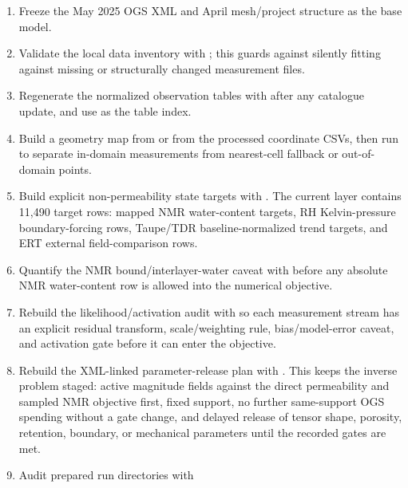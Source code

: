 \begin{enumerate}[leftmargin=1.5em]
  \item Freeze the May 2025 OGS XML and April mesh/project structure as the base model.
  \item Validate the local data inventory with
  ; this guards
  against silently fitting against missing or structurally changed measurement files.
  \item Regenerate the normalized observation tables with
   after any
  catalogue update, and use  as the table
  index.
  \item Build a geometry map from  or
  from the processed coordinate CSVs, then run
   to separate
  in-domain measurements from nearest-cell fallback or out-of-domain points.
  \item Build explicit non-permeability state targets with
  .  The current
  layer contains 11,490 target rows: mapped NMR water-content targets, RH
  Kelvin-pressure boundary-forcing rows, Taupe/TDR baseline-normalized trend targets,
  and ERT external field-comparison rows.
  \item Quantify the NMR bound/interlayer-water caveat with
   before any
  absolute NMR water-content row is allowed into the numerical objective.
  \item Rebuild the likelihood/activation audit with
   so each
  measurement stream has an explicit residual transform, scale/weighting rule,
  bias/model-error caveat, and activation gate before it can enter the objective.
  \item Rebuild the XML-linked parameter-release plan with
  .  This
  keeps the inverse problem staged: active  magnitude fields against the
  direct permeability and sampled NMR objective first, fixed  support, no
  further same-support OGS spending without a gate change, and delayed release of
  tensor shape, porosity, retention, boundary, or mechanical parameters until the
  recorded gates are met.
  \item Audit prepared run directories with

\end{enumerate}
